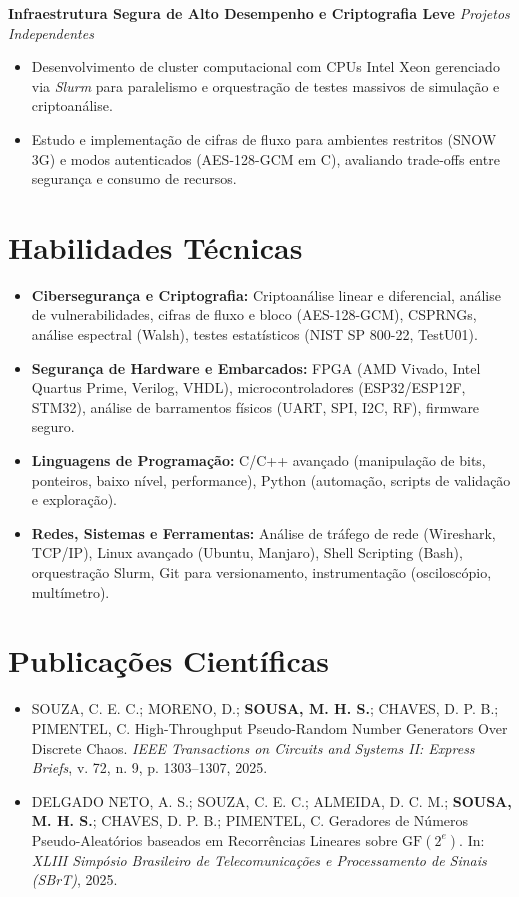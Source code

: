 \documentclass[11pt,a4paper]{article}
\begin{document}
\textbf{Infraestrutura Segura de Alto Desempenho e Criptografia Leve} \hfill \textit{Projetos Independentes}
\begin{itemize}[leftmargin=*, noitemsep]
    \item Desenvolvimento de cluster computacional com CPUs Intel Xeon gerenciado via \textit{Slurm} para paralelismo e orquestração de testes massivos de simulação e criptoanálise.
    \item Estudo e implementação de cifras de fluxo para ambientes restritos (SNOW 3G) e modos autenticados (AES-128-GCM em C), avaliando trade-offs entre segurança e consumo de recursos.
\end{itemize}

\section*{Habilidades Técnicas}
\begin{itemize}[leftmargin=*, noitemsep]
    \item \textbf{Cibersegurança e Criptografia:} Criptoanálise linear e diferencial, análise de vulnerabilidades, cifras de fluxo e bloco (AES-128-GCM), CSPRNGs, análise espectral (Walsh), testes estatísticos (NIST SP 800-22, TestU01).
    \item \textbf{Segurança de Hardware e Embarcados:} FPGA (AMD Vivado, Intel Quartus Prime, Verilog, VHDL), microcontroladores (ESP32/ESP12F, STM32), análise de barramentos físicos (UART, SPI, I2C, RF), firmware seguro.
    \item \textbf{Linguagens de Programação:} C/C++ avançado (manipulação de bits, ponteiros, baixo nível, performance), Python (automação, scripts de validação e exploração).
    \item \textbf{Redes, Sistemas e Ferramentas:} Análise de tráfego de rede (Wireshark, TCP/IP), Linux avançado (Ubuntu, Manjaro), Shell Scripting (Bash), orquestração Slurm, Git para versionamento, instrumentação (osciloscópio, multímetro).
\end{itemize}

\section*{Publicações Científicas}
\begin{itemize}[leftmargin=*, noitemsep]
    \item SOUZA, C. E. C.; MORENO, D.; \textbf{SOUSA, M. H. S.}; CHAVES, D. P. B.; PIMENTEL, C. High-Throughput Pseudo-Random Number Generators Over Discrete Chaos. \textit{IEEE Transactions on Circuits and Systems II: Express Briefs}, v. 72, n. 9, p. 1303--1307, 2025.
    \item DELGADO NETO, A. S.; SOUZA, C. E. C.; ALMEIDA, D. C. M.; \textbf{SOUSA, M. H. S.}; CHAVES, D. P. B.; PIMENTEL, C. Geradores de Números Pseudo-Aleatórios baseados em Recorrências Lineares sobre $\mathrm{GF}(2^e)$. In: \textit{XLIII Simpósio Brasileiro de Telecomunicações e Processamento de Sinais (SBrT)}, 2025.
\end{itemize}
\end{document}
